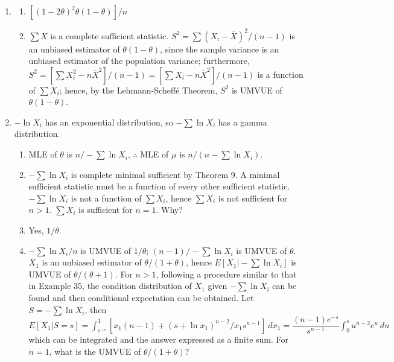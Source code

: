 \begin{enumerate}
	\item[22.] \begin{enumerate}
		\item[(a)] $[(1-2\theta)^2\theta(1-\theta)]/n$
		\item[(b)] $\sum X$ is a complete sufficient statistic. $S^2=\sum(X_i-\overline{X})^2/(n-1)$ is an unbiased estimator of $\theta(1-\theta)$, since the sample variance is an unbiased estimator of the population variance; furthermore, $S^2=[\sum X_i^2-n\overline{X}^2]/(n-1) = [\sum X_i -n\overline{X}^2]/(n-1)$ is a function of $\sum X_i$; hence, by the Lehmann-Scheff\'e Theorem, $S^2$ is UMVUE of $\theta(1-\theta)$.  
	\end{enumerate}	
	
	\item[24.] $-\ln X_i$ has an exponential distribution, so $-\sum \ln X_i$ has a gamma distribution.
	\begin{enumerate}
		\item[(a)] MLE of $\theta$ is $n/-\sum \ln X_i$, $\therefore$ MLE of $\mu$ is $n/(n-\sum \ln X_i)$.
		
		\newpage
		
		\item[(b)] $-\sum \ln X_i$ is complete minimal sufficient by Theorem 9.  A minimal sufficient statistic must be a function of every other sufficient statistic. $-\sum \ln X_i$ is not a function of $\sum X_i$, hence $\sum X_i$ is not sufficient for $n>1$. $\sum X_i$ is sufficient for $n=1$. Why?
		\item[(c)] Yes, $1/\theta$.
		\item[(d)] $-\sum \ln X_i/n$ is UMVUE of $1/\theta$; $(n-1)/-\sum \ln X_i$ is UMVUE of $\theta$. $X_1$ is an unbiased estimator of $\theta/(1+\theta)$, hence $E[X_1 \vert -\sum \ln X_i]$ is UMVUE of $\theta/(\theta + 1)$. For $n>1$, following a procedure similar to that in Example 35, the condition distribution of $X_1$ given $-\sum \ln X_i$ can be found and then conditional expectation can be obtained. Let $S = -\sum \ln X_i$, then $E[X_1\vert S=s] = \displaystyle\int_{e^{-s}}^{1} [x_1(n-1) + (s+\ln x_1)^{n-2}/x_1s^{n-1}]\ dx_1 = \dfrac{(n-1)e^{-s}}{s^{n-1}}\int_0^s u^{n-2}e^u\ du$ which can be integrated and the answer expressed as a finite sum. For $n=1$, what is the UMVUE of $\theta/(1+\theta)$?
	\end{enumerate}
	

\end{enumerate}
